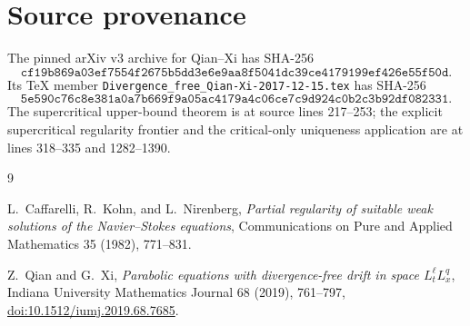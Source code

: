 \documentclass[11pt]{article}
\theoremstyle{remark}
\begin{document}
\section*{Source provenance}

The pinned arXiv v3 archive for Qian--Xi has SHA-256
\[
\texttt{cf19b869a03ef7554f2675b5dd3e6e9aa8f5041dc39ce4179199ef426e55f50d}.
\]
Its TeX member
\texttt{Divergence\_free\_Qian-Xi-2017-12-15.tex} has SHA-256
\[
\texttt{5e590c76c8e381a0a7b669f9a05ac4179a4c06ce7c9d924c0b2c3b92df082331}.
\]
The supercritical upper-bound theorem is at source lines 217--253; the
explicit supercritical regularity frontier and the critical-only
uniqueness application are at lines 318--335 and 1282--1390.

\begin{thebibliography}{9}
\raggedright

L.~Caffarelli, R.~Kohn, and L.~Nirenberg,
\emph{Partial regularity of suitable weak solutions of the
Navier--Stokes equations},
Communications on Pure and Applied Mathematics 35 (1982), 771--831.

Z.~Qian and G.~Xi,
\emph{Parabolic equations with divergence-free drift in space
\(L_t^\ell L_x^q\)},
Indiana University Mathematics Journal 68 (2019), 761--797,
\href{https://doi.org/10.1512/iumj.2019.68.7685}
{doi:10.1512/iumj.2019.68.7685}.

\end{thebibliography}
\end{document}
